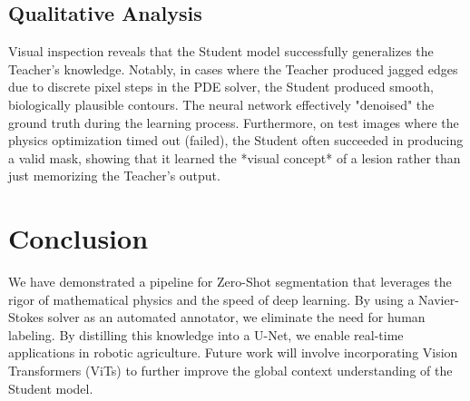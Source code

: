 \documentclass[journal]{IEEEtran}
\begin{document}
\subsection{Qualitative Analysis}
Visual inspection reveals that the Student model successfully generalizes the Teacher's knowledge. Notably, in cases where the Teacher produced jagged edges due to discrete pixel steps in the PDE solver, the Student produced smooth, biologically plausible contours. The neural network effectively "denoised" the ground truth during the learning process. Furthermore, on test images where the physics optimization timed out (failed), the Student often succeeded in producing a valid mask, showing that it learned the *visual concept* of a lesion rather than just memorizing the Teacher's output.

\section{Conclusion}
We have demonstrated a pipeline for Zero-Shot segmentation that leverages the rigor of mathematical physics and the speed of deep learning. By using a Navier-Stokes solver as an automated annotator, we eliminate the need for human labeling. By distilling this knowledge into a U-Net, we enable real-time applications in robotic agriculture. Future work will involve incorporating Vision Transformers (ViTs) to further improve the global context understanding of the Student model.



\end{document}
